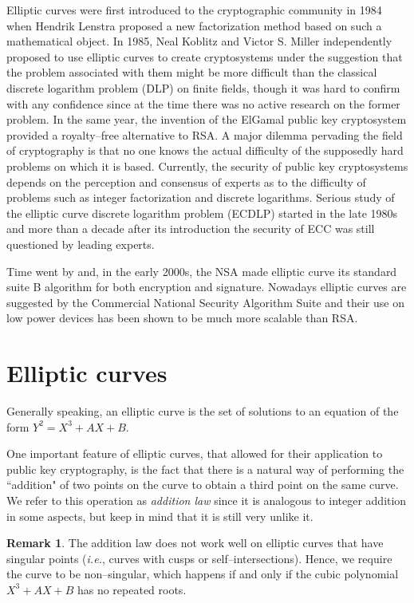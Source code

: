\documentclass[9pt]{article}
\theoremstyle{definition}
\newtheorem*{remark}{Remark}
\begin{document}
Elliptic curves were first introduced to the cryptographic community in 1984 when Hendrik Lenstra proposed a new factorization method based on such a mathematical object. In 1985, Neal Koblitz and Victor S. Miller independently proposed to use elliptic curves to create cryptosystems under the suggestion that the problem associated with them might be more difficult than the classical discrete logarithm problem (DLP) on finite fields, though it was hard to confirm with any confidence since at the time there was no active research on the former problem. In the same year, the invention of the ElGamal public key cryptosystem provided a royalty--free alternative to RSA. A major dilemma pervading the field of cryptography is that no one knows the actual difficulty of the supposedly hard problems on which it is based. Currently, the security of public key cryptosystems depends on the perception and consensus of experts as to the difficulty of problems such as integer
factorization and discrete logarithms. Serious study of the elliptic curve discrete logarithm problem (ECDLP) started in the late 1980s and more than a decade after its introduction the security of ECC was still questioned by leading experts.

Time went by and, in the early 2000s, the NSA made elliptic curve its standard suite B algorithm for both encryption and signature. Nowadays elliptic curves are suggested by the Commercial National Security Algorithm Suite and their use on low power devices has been shown to be much more scalable than RSA.

\section{Elliptic curves}

Generally speaking, an elliptic curve is the set of solutions to an equation of the form $Y^2 = X^3 + AX + B$.

One important feature of elliptic curves, that allowed for their application to public key cryptography, is the fact that there is a natural way of performing the ``addition" of two points on the curve to obtain a third point on the same curve. We refer to this operation as \textit{addition law} since it is analogous to integer addition in some aspects, but keep in mind that it is still very unlike it.

\begin{remark}
The addition law does not work well on elliptic curves that have singular points (\textit{i.e.}, curves with cusps or self--intersections). Hence, we require the curve to be non--singular, which happens if and only if the cubic polynomial $X^3 + AX + B$ has no repeated roots.
\end{remark}
\end{document}
